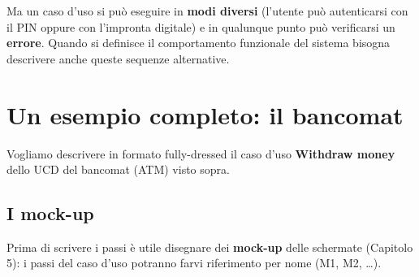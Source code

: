 
Ma un caso d'uso si può eseguire in \textbf{modi diversi} (l'utente può autenticarsi con il PIN oppure con l'impronta digitale)
e in qualunque punto può verificarsi un \textbf{errore}. Quando si definisce il comportamento funzionale del sistema bisogna
descrivere anche queste sequenze alternative.



\section{Un esempio completo: il bancomat}

Vogliamo descrivere in formato fully-dressed il caso d'uso \textbf{Withdraw money} dello UCD del bancomat (ATM) visto sopra.

\subsection{I mock-up}

Prima di scrivere i passi è utile disegnare dei \textbf{mock-up} delle schermate (Capitolo 5): i passi del caso d'uso potranno
farvi riferimento per nome (M1, M2, \ldots).

\newcommand{\atmscreen}[3]{%
  \begin{scope}[shift={#1}]
    \draw[rounded corners=3pt, line width=0.9pt, fill=white, draw=black!70] (0,0) rectangle (3.6,2.3);
    \node[chip=ph4, anchor=north west] at (0.08,2.22) {#2};
    #3
  \end{scope}}
\newcommand{\atmbtn}[3]{\node[draw=black!60, fill=swlight, rounded corners=1pt, font=\tiny, minimum width=#3, minimum height=0.3cm, inner sep=1pt] at #1 {#2};}

